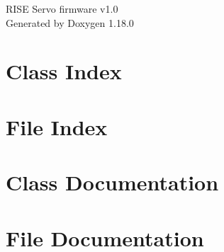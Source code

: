 \documentclass[twoside]{book}
\newcommand{\+}{\discretionary{\mbox{\scriptsize$\hookleftarrow$}}{}{}}
\newcommand{\clearemptydoublepage}{%
    \newpage{\pagestyle{empty}\cleardoublepage}%
  }
\begin{document}
  \raggedbottom
    \hypersetup{pageanchor=false,
                bookmarksnumbered=true,
                pdfencoding=unicode
               }
  \begin{titlepage}
  \vspace*{7cm}
  \begin{center}%
  {\Large RISE Servo firmware v1.\+0}\\
  \vspace*{1cm}
  {\large Generated by Doxygen 1.18.0}\\
  \end{center}
  \end{titlepage}
  \clearemptydoublepage
  \tableofcontents
  \clearemptydoublepage
  \hypersetup{pageanchor=true}
\chapter{Class Index}

\chapter{File Index}

\chapter{Class Documentation}
















\chapter{File Documentation}








  \backmatter
  \newpage
  \clearemptydoublepage
  \printindex
\end{document}
